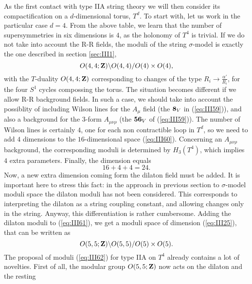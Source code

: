   
\vspace{2 mm}
  
  

As the first contact with type IIA string theory we will then consider
its compactification on a $d$-dimensional torus, $T^d$. To start
with, let us work in the particular case $d=4$. From the above table, 
we learn that the number of
supersymmetries in six dimensions is $4$, as the holonomy of
$T^4$ is trivial. If we do not take into account the R-R fields,
the moduli of the string $\sigma$-model is exactly the one
described in section \ref{sec:III1},
\begin{equation}
O(4,4;{\bf Z}) \backslash O(4,4)/O(4) \times O(4),
\label{eq:III60}
\end{equation}
with the $T$-duality $O(4,4;{\bf Z})$ corresponding to changes of
the type $R_i \rightarrow \frac {\alpha'}{R_i}$, for the four
$S^1$ cycles compossing the torus. The situation becomes
different if we allow R-R background fields. In such a case, we
should take into account the possiblity of including Wilson lines
for the $A_{\mu}$ field (the ${\bf 8}_V$ in (\ref{eq:III59})),
and also a background for the $3$-form $A_{\mu \nu \rho}$ (the
${\bf 56}_V$ of (\ref{eq:III59})). The number of Wilson lines is
certainly $4$, one for each non contractible loop in $T^d$, so we
need to add $4$ dimensions to the $16$-dimensional space
(\ref{eq:III60}). Concerning an $A_{\mu \nu \rho}$ background,
the corresponding moduli is determined by $H_3(T^4)$, which
implies $4$ extra parameters. Finally, the dimension equals
\begin{equation}
16+4+4=24.
\label{eq:III61}
\end{equation}
Now, a new extra dimension coming form the dilaton field must be
added. It is important here to stress this fact: in the approach
in previous section to $\sigma$-model moduli space the dilaton
moduli has not been considered. This corresponds to interpreting
the dilaton as a string coupling constant, and allowing changes
only in the string. Anyway, this differentiation is rather
cumbersome. Adding the dilaton moduli to (\ref{eq:III61}), we get
a moduli space of dimension (\ref{eq:III25}), that can be written
as 
\begin{equation}
O(5,5;{\bf Z}) \backslash O(5,5)/O(5) \times O(5).
\label{eq:III62}
\end{equation}
The proposal of moduli (\ref{eq:III62}) for type IIA on $T^4$
already contains a lot of novelties. First of all, the modular
group $O(5,5;{\bf Z})$ now acts on the dilaton and the resting
